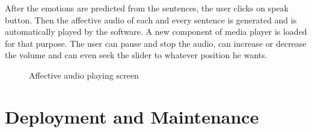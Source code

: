 \documentclass[oneside,a4paper,12pt]{book}
\begin{document}
\newpage 
After the emotions are predicted from the sentences, the user clicks on speak button. Then the affective audio of each and every sentence is generated and is automatically played by the software. A new component of media player is loaded for that purpose. The user can pause and stop the audio, can increase or decrease the volume and can even seek the slider to whatever position he wants.
  \begin{center}
  	\begin{figure}[!htbp]
  		
  		\caption{Affective audio playing screen}
  		\label{fig:Affective Audio playing screen}
  	\end{figure}
  \end{center} 

\chapter{Deployment and Maintenance}
\end{document}

